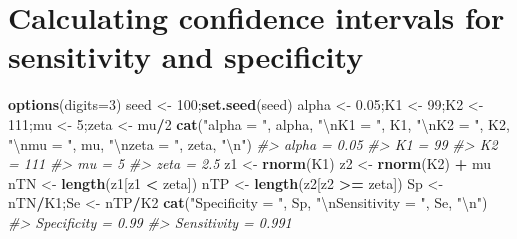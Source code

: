\documentclass[
]{book}
\newenvironment{Shaded}{\begin{snugshade}}{\end{snugshade}}
\newcommand{\CharTok}[1]{\textcolor[rgb]{0.31,0.60,0.02}{#1}}
\newcommand{\CommentTok}[1]{\textcolor[rgb]{0.56,0.35,0.01}{\textit{#1}}}
\newcommand{\DataTypeTok}[1]{\textcolor[rgb]{0.13,0.29,0.53}{#1}}
\newcommand{\DecValTok}[1]{\textcolor[rgb]{0.00,0.00,0.81}{#1}}
\newcommand{\FloatTok}[1]{\textcolor[rgb]{0.00,0.00,0.81}{#1}}
\newcommand{\KeywordTok}[1]{\textcolor[rgb]{0.13,0.29,0.53}{\textbf{#1}}}
\newcommand{\NormalTok}[1]{#1}
\newcommand{\OperatorTok}[1]{\textcolor[rgb]{0.81,0.36,0.00}{\textbf{#1}}}
\newcommand{\StringTok}[1]{\textcolor[rgb]{0.31,0.60,0.02}{#1}}
\begin{document}
\hypertarget{calculating-confidence-intervals-for-sensitivity-and-specificity}{%
\section{Calculating confidence intervals for sensitivity and specificity}\label{calculating-confidence-intervals-for-sensitivity-and-specificity}}

\begin{Shaded}
\begin{Highlighting}[]
\KeywordTok{options}\NormalTok{(}\DataTypeTok{digits=}\DecValTok{3}\NormalTok{)}
\NormalTok{seed \textless{}{-}}\StringTok{ }\DecValTok{100}\NormalTok{;}\KeywordTok{set.seed}\NormalTok{(seed)}
\NormalTok{alpha \textless{}{-}}\StringTok{ }\FloatTok{0.05}\NormalTok{;K1 \textless{}{-}}\StringTok{ }\DecValTok{99}\NormalTok{;K2 \textless{}{-}}\StringTok{ }\DecValTok{111}\NormalTok{;mu \textless{}{-}}\StringTok{ }\DecValTok{5}\NormalTok{;zeta \textless{}{-}}\StringTok{ }\NormalTok{mu}\OperatorTok{/}\DecValTok{2}
\KeywordTok{cat}\NormalTok{(}\StringTok{"alpha = "}\NormalTok{, alpha, }
    \StringTok{"}\CharTok{\textbackslash{}n}\StringTok{K1 = "}\NormalTok{, K1, }
    \StringTok{"}\CharTok{\textbackslash{}n}\StringTok{K2 = "}\NormalTok{, K2, }
    \StringTok{"}\CharTok{\textbackslash{}n}\StringTok{mu = "}\NormalTok{, mu, }
    \StringTok{"}\CharTok{\textbackslash{}n}\StringTok{zeta = "}\NormalTok{, zeta, }\StringTok{"}\CharTok{\textbackslash{}n}\StringTok{"}\NormalTok{)}
\CommentTok{\#\textgreater{} alpha =  0.05 }
\CommentTok{\#\textgreater{} K1 =  99 }
\CommentTok{\#\textgreater{} K2 =  111 }
\CommentTok{\#\textgreater{} mu =  5 }
\CommentTok{\#\textgreater{} zeta =  2.5}
\NormalTok{z1 \textless{}{-}}\StringTok{ }\KeywordTok{rnorm}\NormalTok{(K1)}
\NormalTok{z2 \textless{}{-}}\StringTok{ }\KeywordTok{rnorm}\NormalTok{(K2) }\OperatorTok{+}\StringTok{ }\NormalTok{mu}
\NormalTok{nTN \textless{}{-}}\StringTok{ }\KeywordTok{length}\NormalTok{(z1[z1 }\OperatorTok{\textless{}}\StringTok{ }\NormalTok{zeta])}
\NormalTok{nTP \textless{}{-}}\StringTok{ }\KeywordTok{length}\NormalTok{(z2[z2 }\OperatorTok{\textgreater{}=}\StringTok{ }\NormalTok{zeta])}
\NormalTok{Sp \textless{}{-}}\StringTok{ }\NormalTok{nTN}\OperatorTok{/}\NormalTok{K1;Se \textless{}{-}}\StringTok{ }\NormalTok{nTP}\OperatorTok{/}\NormalTok{K2}
\KeywordTok{cat}\NormalTok{(}\StringTok{"Specificity = "}\NormalTok{, Sp, }
    \StringTok{"}\CharTok{\textbackslash{}n}\StringTok{Sensitivity = "}\NormalTok{, Se, }\StringTok{"}\CharTok{\textbackslash{}n}\StringTok{"}\NormalTok{)}
\CommentTok{\#\textgreater{} Specificity =  0.99 }
\CommentTok{\#\textgreater{} Sensitivity =  0.991}


\end{Highlighting}
\end{Shaded}
\end{document}
